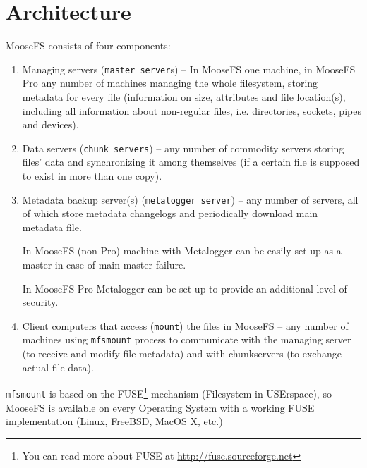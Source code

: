 \documentclass[a4paper,11pt,english]{report}
\def\code#1{\texttt{#1}}
\begin{document}
		\section{Architecture}
		MooseFS consists of four components:
		\begin{enumerate}
			\item Managing servers (\code{master server}s) -- In MooseFS one machine, in MooseFS Pro any number of machines managing the whole filesystem, storing metadata for every file (information on size, attributes and file location(s), including all information about non-regular files, i.e. directories, sockets, pipes and devices).
			\item Data servers (\code{chunk servers}) -- any number of commodity servers storing files' data and synchronizing it among themselves (if a certain file is supposed to exist in more than one copy).
			\item Metadata backup server(s) (\code{metalogger server}) -- any number of servers, all of which store metadata changelogs and periodically download main metadata file.
			
			In MooseFS (non-Pro) machine with Metalogger can be easily set up as a master in case of main master failure.
			
			In MooseFS Pro Metalogger can be set up to provide an additional level of security.
			\item Client computers that access (\code{mount}) the files in MooseFS -- any number of machines using \code{mfsmount} process to communicate with the managing server (to receive and modify file metadata) and with chunkservers (to exchange actual file data).
		\end{enumerate}

		\bigskip

		\code{mfsmount} is based on the FUSE\footnote{You can read more about FUSE at \url{http://fuse.sourceforge.net}} mechanism (Filesystem in USErspace), so MooseFS is available on every Operating System with a working FUSE implementation (Linux, FreeBSD, MacOS X, etc.)  

		\bigskip
\end{document}
